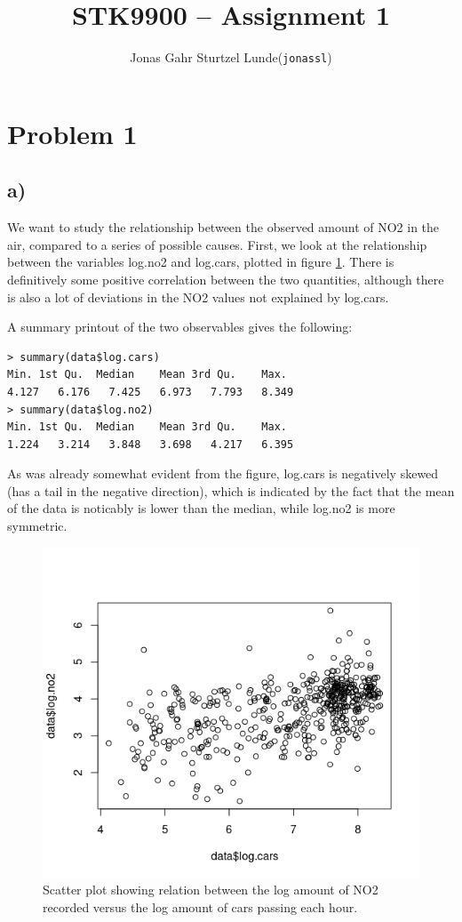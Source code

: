 \documentclass[a4paper, twocolumn]{article}
\begin{document}
\title{STK9900 -- Assignment 1}
\author{
    \begin{tabular}{r l}
        Jonas Gahr Sturtzel Lunde & (\texttt{jonassl})
    \end{tabular}}
\maketitle

\section*{Problem 1}
\subsection*{a)}
We want to study the relationship between the observed amount of NO2 in the air, compared to a series of possible causes. First, we look at the relationship between the variables log.no2 and log.cars, plotted in figure \ref{fig:no2_cars_vs_no2}. There is definitively some positive correlation between the two quantities, although there is also a lot of deviations in the NO2 values not explained by log.cars.

A summary printout of the two observables gives the following:
\begin{Verbatim}[fontsize=\small]
> summary(data$log.cars)
Min. 1st Qu.  Median    Mean 3rd Qu.    Max. 
4.127   6.176   7.425   6.973   7.793   8.349 
> summary(data$log.no2)
Min. 1st Qu.  Median    Mean 3rd Qu.    Max. 
1.224   3.214   3.848   3.698   4.217   6.395 
\end{Verbatim}
As was already somewhat evident from the figure, log.cars is negatively skewed (has a tail in the negative direction), which is indicated by the fact that the mean of the data is noticably is lower than the median, while log.no2 is more symmetric.

\begin{figure}
    \centering
    \includegraphics[width=0.8\linewidth]{figures/no2_cars_vs_no2.png}
    \caption{Scatter plot showing relation between the log amount of NO2 recorded versus the log amount of cars passing each hour.}
    \label{fig:no2_cars_vs_no2}
\end{figure}
\end{document}
